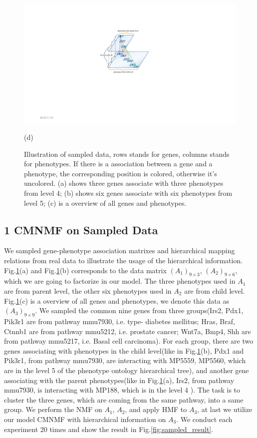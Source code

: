 \documentclass{bmcart}
\begin{document}
\begin{figure}[!h]
   \begin{minipage}{.4\linewidth}
   \includegraphics[width=\linewidth]{DrawPictures/sampled_hierarchical.pdf}
    \centerline{(d)}
  \end{minipage}
  \caption{Illustration of sampled data, rows stands for genes, columns stands for phenotypes. If there is a association between a gene and a phenotype, the corresponding position is colored, otherwise it's uncolored. (a) shows three genes associate with three phenotypes from level 4; (b) shows six genes associate with six phenotypes from level 5; (c) is a overview of all genes and phenotypes.}
  \label{fig:sampled_raw_data}
\end{figure}
\subsection*{\textbf{1 CMNMF on Sampled Data}}
We sampled gene-phenotype association matrixes and hierarchical mapping relations from real data to illustrate the usage of the hierarchical information. Fig.\ref{fig:sampled_raw_data}(a) and Fig.\ref{fig:sampled_raw_data}(b) corresponds to the data matrix $(A_1)_{9\times3}$, $(A_2)_{9\times6}$, which we are going to factorize in our model. The three phenotypes used in $A_1$ are from parent level, the other six phenotypes used in $A_2$ are from child level. Fig.\ref{fig:sampled_raw_data}(c) is a overview of all genes and phenotypes, we denote this data as $(A_3)_{9\times9}$. We sampled the common nine genes from three groups(Irs2, Pdx1, Pik3r1 are from pathway mmu7930, i.e. type-\uppercase\expandafter{} diabetes mellitus; Hras, Braf, Ctnnb1 are from pathway mmu5212, i.e. prostate cancer; Wnt7a, Bmp4, Shh are from pathway mmu5217, i.e. Basal cell carcinoma). For each group, there are two genes associating with phenotypes in the child level(like in Fig.\ref{fig:sampled_raw_data}(b), Pdx1 and Pik3r1, from pathway mmu7930, are interacting with MP5559, MP5560, which are in the level 5 of the phenotype ontology hierarchical tree), and another gene associating with the parent phenotypes(like in Fig.\ref{fig:sampled_raw_data}(a), Irs2, from pathway mmu7930, is interacting with MP188, which is in the level 4 ). The task is to cluster the three genes, which are coming from the same pathway, into a same group. We perform the NMF on $A_1$, $A_2$, and apply HMF to $A_3$, at last we utilize our model CMNMF with hierarchical information on $A_3$. We conduct each experiment 20 times and show the result in Fig.\ref{fig:sampled_result}.
\end{document}
